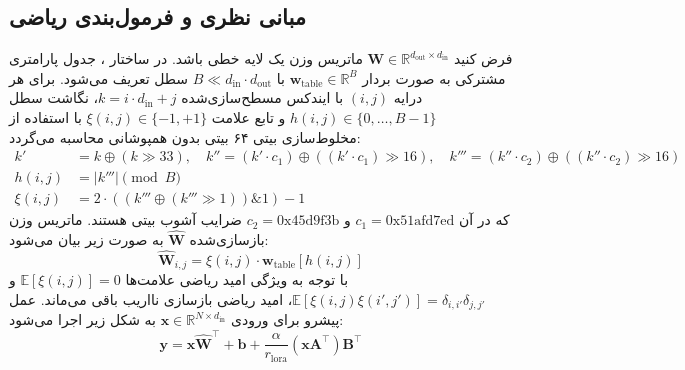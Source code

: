 \subsection{مبانی نظری و فرمول‌بندی ریاضی}
فرض کنید $\mathbf{W} \in \mathbb{R}^{d_{\text{out}} \times d_{\text{in}}}$ ماتریس وزن یک لایه خطی باشد. در ساختار ، جدول پارامتری مشترکی به صورت بردار $\mathbf{w}_{\text{table}} \in \mathbb{R}^{B}$ با $B \ll d_{\text{in}} \cdot d_{\text{out}}$ سطل تعریف می‌شود. برای هر درایه $(i, j)$ با ایندکس مسطح‌سازی‌شده $k = i \cdot d_{\text{in}} + j$، نگاشت سطل $h(i, j) \in \{0, \dots, B-1\}$ و تابع علامت $\xi(i, j) \in \{-1, +1\}$ با استفاده از مخلوط‌سازی بیتی ۶۴ بیتی بدون همپوشانی محاسبه می‌گردد:
\begin{align}
k' &= k \oplus (k \gg 33), \quad k'' = (k' \cdot c_1) \oplus ((k' \cdot c_1) \gg 16), \quad k''' = (k'' \cdot c_2) \oplus ((k'' \cdot c_2) \gg 16) \\
h(i, j) &= |k'''| \pmod B \\
\xi(i, j) &= 2 \cdot ((k''' \oplus (k''' \gg 1)) \mathbin{\&} 1) - 1
\end{align}
که در آن $c_1 = \text{0x51afd7ed}$ و $c_2 = \text{0x45d9f3b}$ ضرایب آشوب بیتی هستند. ماتریس وزن بازسازی‌شده $\hat{\mathbf{W}}$ به صورت زیر بیان می‌شود:
\begin{equation}
\hat{\mathbf{W}}_{i, j} = \xi(i, j) \cdot \mathbf{w}_{\text{table}}[h(i, j)]
\end{equation}
با توجه به ویژگی امید ریاضی علامت‌ها $\mathbb{E}[\xi(i, j)] = 0$ و $\mathbb{E}[\xi(i, j) \xi(i', j')] = \delta_{i, i'} \delta_{j, j'}$، امید ریاضی بازسازی نااریب باقی می‌ماند. عمل پیشرو برای ورودی $\mathbf{x} \in \mathbb{R}^{N \times d_{\text{in}}}$ به شکل زیر اجرا می‌شود:
\begin{equation}
\mathbf{y} = \mathbf{x} \hat{\mathbf{W}}^\top + \mathbf{b} + \frac{\alpha}{r_{\text{lora}}} (\mathbf{x} \mathbf{A}^\top) \mathbf{B}^\top
\end{equation}

